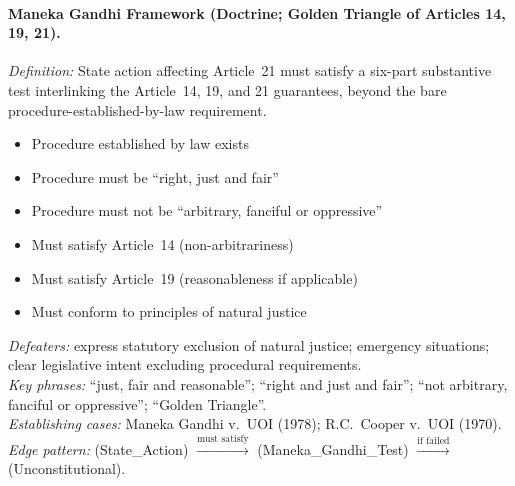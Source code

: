 \documentclass[11pt]{article}
\begin{document}
\paragraph{Maneka Gandhi Framework (Doctrine; Golden Triangle of Articles 14, 19, 21).}
\textit{Definition:} State action affecting Article~21 must satisfy a six-part substantive test interlinking the Article~14, 19, and 21 guarantees, beyond the bare procedure-established-by-law requirement.
\begin{itemize}[nosep,leftmargin=*]
  \item[\textsc{and}] Procedure established by law exists
  \item[\textsc{and}] Procedure must be ``right, just and fair''
  \item[\textsc{and}] Procedure must not be ``arbitrary, fanciful or oppressive''
  \item[\textsc{and}] Must satisfy Article~14 (non-arbitrariness)
  \item[\textsc{and}] Must satisfy Article~19 (reasonableness if applicable)
  \item[\textsc{and}] Must conform to principles of natural justice
\end{itemize}
\textit{Defeaters:} express statutory exclusion of natural justice; emergency situations; clear legislative intent excluding procedural requirements.\\
\textit{Key phrases:} ``just, fair and reasonable''; ``right and just and fair''; ``not arbitrary, fanciful or oppressive''; ``Golden Triangle''.\\
\textit{Establishing cases:} Maneka Gandhi v.\ UOI (1978); R.C.\ Cooper v.\ UOI (1970).\\
\textit{Edge pattern:} (State\_Action) $\xrightarrow{\text{must satisfy}}$ (Maneka\_Gandhi\_Test) $\xrightarrow{\text{if failed}}$ (Unconstitutional).
\end{document}
